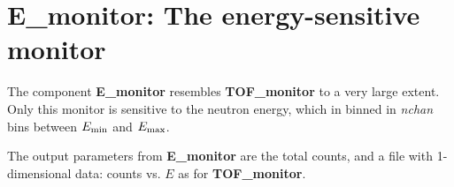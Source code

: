 
\section{E\_monitor: The energy-sensitive monitor}

The component {\bf E\_monitor} resembles {\bf TOF\_monitor}
to a very large extent. Only this monitor is sensitive to
the neutron energy, which in binned in \textit{nchan} bins between
$E_{\rm min}$ and $E_{\rm max}$.

The output parameters from {\bf E\_monitor} are the total counts,
and a file with 1-dimensional data: counts vs. $E$ as for {\bf TOF\_monitor}.



